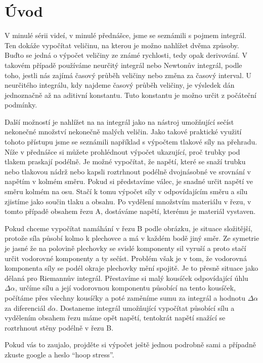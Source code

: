\documentclass[12pt]{article}
\begin{document}
\section*{Úvod}

V minulé sérii videí, v minulé přednášce, jsme se seznámili s pojmem integrál. Ten dokáže vypočítat veličinu, na kterou je možno nahlížet dvěma způsoby. Buďto se jedná o výpočet veličiny ze známé rychlosti, tedy opak derivování. V takovém případě používáme neurčitý integrál nebo Newtonův integrál, podle toho, jestli nás zajímá časový průběh veličiny nebo změna za časový interval. U neurčitého integrálu, kdy najdeme časový průběh veličiny, je výsledek dán jednoznačně až na aditivní konstantu. Tuto konstantu je možno určit z počáteční podmínky.

Další možností je nahlížet na na integrál jako na nástroj umožňující sečíst nekonečné množství nekonečně malých veličin. Jako takové praktické využití tohoto přístupu jsme se seznámili například s výpočtem tlakové síly na přehradu. Níže v přednášce si můžete prohlédnout výpočet ukazující, proč trubky pod tlakem praskají podélně. Je možné vypočítat, že napětí, které se snaží trubku nebo tlakovou nádrž nebo kapsli roztrhnout podélně dvojnásobné ve srovnání v napětím v kolmém směru. Pokud si představíme válec, je snadné určit napětí ve směru kolmém na osu. Stačí k tomu výpočet síly v odpovídajícím směru a sílu zjistíme jako součin tlaku a obsahu. Po vydělení množstvím materiálu v řezu, v tomto případě obsahem řezu A, dostáváme napětí, kterému je materiál vystaven.

Pokud chceme vypočítat namáhání v řezu B podle obrázku, je situace složitější, protože síla působí kolmo k plechovce a má v každém bodě jiný směr. Ze symetrie je jasné že na polovině plechovky se svislé komponenty sil vyruší a proto stačí určit vodorovné komponenty a ty sečíst. Problém však je v tom, že vodorovná komponenta síly se podél okraje plechovky mění spojitě. Je to přesně situace jako dělaná pro Riemannův integrál. Přestavíme si malý kousíček odpovídající úhlu $\Delta \alpha$, určíme sílu a její vodorovnou komponentu působící na tento kousíček, počítáme přes všechny kousíčky a poté zaměníme sumu za integrál a hodnotu $\Delta \alpha$ za diferenciál $d\alpha$. Dostaneme integrál umožňující vypočítat působící sílu a vydělením obsahem řezu máme opět napětí, tentokrát napětí snažící se roztrhnout stěny podélně v řezu B.

Pokud vás to zaujalo, projděte si výpočet ještě jednou podrobně sami a případně zkuste google a heslo ``hoop stress''.
\end{document}
